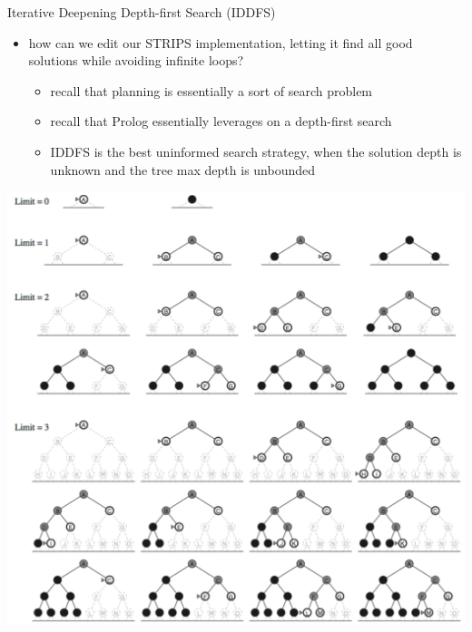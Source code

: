 \documentclass[presentation]{beamer}\mode<presentation>{\usetheme{AMSBolognaFC}}
\begin{document}
\begin{frame}[c,allowframebreaks]{Iterative Deepening Depth-first Search (IDDFS)}

    \begin{itemize}
        \item how can we edit our STRIPS implementation, letting it find \alert{all} good solutions while avoiding infinite loops?
        \begin{itemize}
            \item recall that planning is essentially a sort of \alert{search} problem
            \item recall that Prolog essentially leverages on a \alert{depth-first} search
            \item IDDFS is the best \alert{uninformed} search strategy, when the solution depth is unknown and the tree max depth is unbounded
        \end{itemize}
    \end{itemize}

\framebreak

\begin{center}
    \includegraphics[width=.6\linewidth]{./figures/iddfs.png}
\end{center}


\end{frame}
\end{document}
